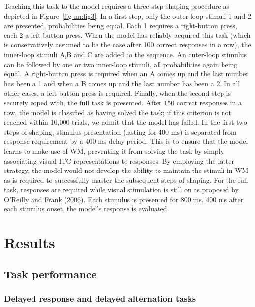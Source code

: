 \documentclass[
  11pt,
  a4paper,
]{scrbook}
\begin{document}
Teaching this task to the model requires a three-step shaping procedure
as depicted in Figure~\ref{fig-nn:fig3}. In a first step, only the
outer-loop stimuli 1 and 2 are presented, probabilities being equal.
Each 1 requires a right-button press, each 2 a left-button press. When
the model has reliably acquired this task (which is conservatively
assumed to be the case after 100 correct responses in a row), the
inner-loop stimuli A,B and C are added to the sequence. An outer-loop
stimulus can be followed by one or two inner-loop stimuli, all
probabilities again being equal. A right-button press is required when
an A comes up and the last number has been a 1 and when a B comes up and
the last number has been a 2. In all other cases, a left-button press is
required. Finally, when the second step is securely coped with, the full
task is presented. After 150 correct responses in a row, the model is
classified as having solved the task; if this criterion is not reached
within 10,000 trials, we admit that the model has failed. In the first
two steps of shaping, stimulus presentation (lasting for 400 ms) is
separated from response requirement by a 400 ms delay period. This is to
ensure that the model learns to make use of WM, preventing it from
solving the task by simply associating visual ITC representations to
responses. By employing the latter strategy, the model would not develop
the ability to maintain the stimuli in WM as is required to successfully
master the subsequent steps of shaping. For the full task, responses are
required while visual stimulation is still on as proposed by O'Reilly
and Frank (2006). Each stimulus is presented for 800 ms. 400 ms after
each stimulus onset, the model's response is evaluated.

\section{Results}\label{results-2}

\subsection{Task performance}\label{task-performance}

\subsubsection*{Delayed response and delayed alternation
tasks}\label{delayed-response-and-delayed-alternation-tasks-1}
\end{document}
